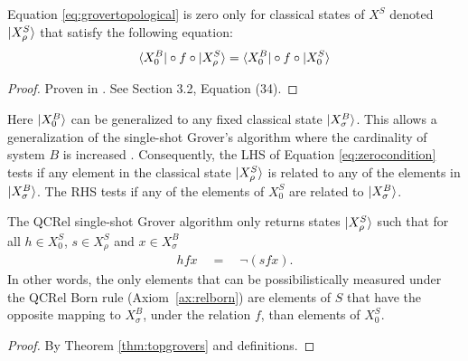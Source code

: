 \begin{theorem}
\label{thm:topgrovers}
Equation \ref{eq:grovertopological} is zero only for classical states of $X^S$ denoted $| X_{\rho}^S \rangle$ that satisfy the following equation:
\begin{equation}
\label{eq:zerocondition}
\langle X_0^B | \circ f \circ | X_{\rho}^S \rangle = \langle X_0^B | \circ f \circ | X_0^S \rangle
\end{equation}
\end{theorem}
\begin{proof}
Proven in \cite{vicary-tqa}. See Section 3.2, Equation (34).
\end{proof}

Here $| X_0^B \rangle$ can be generalized to any fixed classical state $| X_{\sigma}^B \rangle$. This allows a generalization of the single-shot Grover's algorithm where the cardinality of system $B$ is increased \cite{vicary-tqa}.
Consequently, the LHS of Equation \ref{eq:zerocondition} tests if any element in the classical state $| X_{\rho}^S \rangle$ is related to any of the elements in $| X_{\sigma}^B \rangle$. The RHS tests if any of the elements of $X_0^S$ are related to $| X_{\sigma}^B \rangle$.

\begin{proposition}
The QCRel single-shot Grover algorithm only returns states $| X_{\rho}^S \rangle$ such that for all $h \in X^S_0$, $s\in X_{\rho}^S$ and $x\in X_{\sigma}^B$
\begin{align*}
h f x \quad = \quad \neg(s f x) .
\end{align*}
In other words, the only elements that can be possibilistically measured under the QCRel Born rule (Axiom~\ref{ax:relborn}) are elements of $S$ that have the opposite mapping to $X_{\sigma}^B$, under the relation $f$, than elements of $X^{S}_0$.
\end{proposition}
\begin{proof}
By Theorem \ref{thm:topgrovers} and definitions.
\end{proof}

